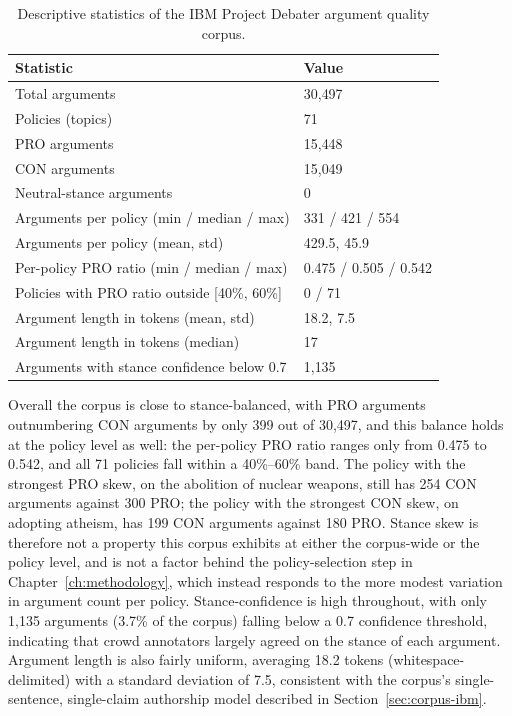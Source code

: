 \begin{table}[htbp]
\centering
\caption{Descriptive statistics of the IBM Project Debater argument quality corpus.}
\label{tab:ibm-stats}
\begin{tabular}{ll}
\toprule
\textbf{Statistic} & \textbf{Value} \\
\midrule
Total arguments & 30{,}497 \\
Policies (topics) & 71 \\
PRO arguments & 15{,}448 \\
CON arguments & 15{,}049 \\
Neutral-stance arguments & 0 \\
Arguments per policy (min / median / max) & 331 / 421 / 554 \\
Arguments per policy (mean, std) & 429.5, 45.9 \\
Per-policy PRO ratio (min / median / max) & 0.475 / 0.505 / 0.542 \\
Policies with PRO ratio outside {[}40\%, 60\%{]} & 0 / 71 \\
Argument length in tokens (mean, std) & 18.2, 7.5 \\
Argument length in tokens (median) & 17 \\
Arguments with stance confidence below 0.7 & 1{,}135 \\
\bottomrule
\end{tabular}
\end{table}

Overall the corpus is close to stance-balanced, with PRO arguments outnumbering CON arguments by
only 399 out of 30{,}497, and this balance holds at the policy level as well: the per-policy PRO
ratio ranges only from 0.475 to 0.542, and all 71 policies fall within a 40\%--60\% band. The
policy with the strongest PRO skew, on the abolition of nuclear weapons, still has 254 CON
arguments against 300 PRO; the policy with the strongest CON skew, on adopting atheism, has 199
CON arguments against 180 PRO. Stance skew is therefore not a property this corpus exhibits at
either the corpus-wide or the policy level, and is not a factor behind the policy-selection step
in Chapter~\ref{ch:methodology}, which instead responds to the more modest variation in argument
count per policy. Stance-confidence is high throughout, with only 1{,}135 arguments (3.7\% of the
corpus) falling below a 0.7 confidence threshold, indicating that crowd annotators largely agreed
on the stance of each argument. Argument length is also fairly uniform, averaging 18.2 tokens
(whitespace-delimited) with a standard deviation of 7.5, consistent with the corpus's
single-sentence, single-claim authorship model described in Section~\ref{sec:corpus-ibm}.

